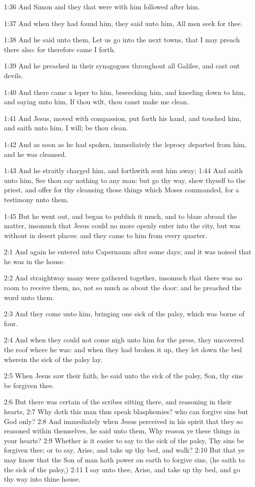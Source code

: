1:36 And Simon and they that were with him followed after him.

1:37 And when they had found him, they said unto him, All men seek for
thee.

1:38 And he said unto them, Let us go into the next towns, that I may
preach there also: for therefore came I forth.

1:39 And he preached in their synagogues throughout all Galilee, and
cast out devils.

1:40 And there came a leper to him, beseeching him, and kneeling down
to him, and saying unto him, If thou wilt, thou canst make me clean.

1:41 And Jesus, moved with compassion, put forth his hand, and touched
him, and saith unto him, I will; be thou clean.

1:42 And as soon as he had spoken, immediately the leprosy departed
from him, and he was cleansed.

1:43 And he straitly charged him, and forthwith sent him away; 1:44
And saith unto him, See thou say nothing to any man: but go thy way,
shew thyself to the priest, and offer for thy cleansing those things
which Moses commanded, for a testimony unto them.

1:45 But he went out, and began to publish it much, and to blaze
abroad the matter, insomuch that Jesus could no more openly enter into
the city, but was without in desert places: and they came to him from
every quarter.

2:1 And again he entered into Capernaum after some days; and it was
noised that he was in the house.

2:2 And straightway many were gathered together, insomuch that there
was no room to receive them, no, not so much as about the door: and he
preached the word unto them.

2:3 And they come unto him, bringing one sick of the palsy, which was
borne of four.

2:4 And when they could not come nigh unto him for the press, they
uncovered the roof where he was: and when they had broken it up, they
let down the bed wherein the sick of the palsy lay.

2:5 When Jesus saw their faith, he said unto the sick of the palsy,
Son, thy sins be forgiven thee.

2:6 But there was certain of the scribes sitting there, and reasoning
in their hearts, 2:7 Why doth this man thus speak blasphemies? who can
forgive sins but God only?  2:8 And immediately when Jesus perceived
in his spirit that they so reasoned within themselves, he said unto
them, Why reason ye these things in your hearts?  2:9 Whether is it
easier to say to the sick of the palsy, Thy sins be forgiven thee; or
to say, Arise, and take up thy bed, and walk?  2:10 But that ye may
know that the Son of man hath power on earth to forgive sins, (he
saith to the sick of the palsy,) 2:11 I say unto thee, Arise, and take
up thy bed, and go thy way into thine house.

